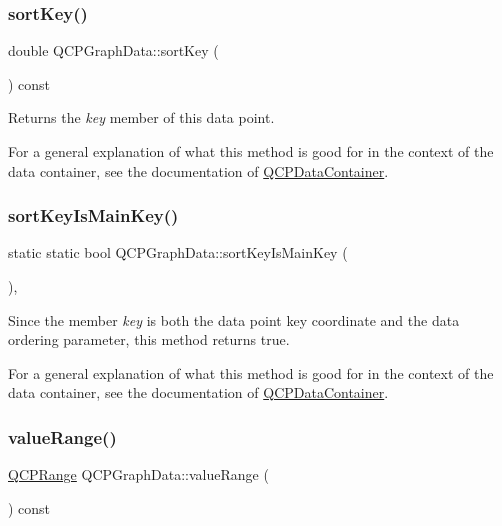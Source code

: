 \subsubsection{\texorpdfstring{sortKey()}{sortKey()}}
{\footnotesize\ttfamily double Q\+C\+P\+Graph\+Data\+::sort\+Key (\begin{DoxyParamCaption}{ }\end{DoxyParamCaption}) const\hspace{0.3cm}{\ttfamily [inline]}}

Returns the {\itshape key} member of this data point.

For a general explanation of what this method is good for in the context of the data container, see the documentation of \mbox{\hyperlink{class_q_c_p_data_container}{Q\+C\+P\+Data\+Container}}. \mbox{\label{class_q_c_p_graph_data_a1c98dfd21b82321a173db4ff860dfd21}} 
\subsubsection{\texorpdfstring{sortKeyIsMainKey()}{sortKeyIsMainKey()}}
{\footnotesize\ttfamily static static bool Q\+C\+P\+Graph\+Data\+::sort\+Key\+Is\+Main\+Key (\begin{DoxyParamCaption}{ }\end{DoxyParamCaption})\hspace{0.3cm}{\ttfamily [inline]}, {\ttfamily [static]}}

Since the member {\itshape key} is both the data point key coordinate and the data ordering parameter, this method returns true.

For a general explanation of what this method is good for in the context of the data container, see the documentation of \mbox{\hyperlink{class_q_c_p_data_container}{Q\+C\+P\+Data\+Container}}. \mbox{\label{class_q_c_p_graph_data_a2f8dd30360356f66cc418a170a9f3792}} 
\subsubsection{\texorpdfstring{valueRange()}{valueRange()}}
{\footnotesize\ttfamily \mbox{\hyperlink{class_q_c_p_range}{Q\+C\+P\+Range}} Q\+C\+P\+Graph\+Data\+::value\+Range (\begin{DoxyParamCaption}{ }\end{DoxyParamCaption}) const\hspace{0.3cm}{\ttfamily [inline]}}

